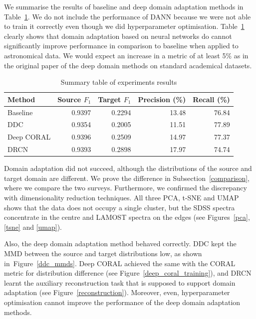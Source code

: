 We summarise the results of baseline and deep domain adaptation methods in Table~\ref{summary}.
We do not include the performance of DANN
because we were not able to train it correctly even though we did hyperparameter optimisation.
Table~\ref{summary} clearly shows that domain adaptation based on neural networks do cannot significantly improve performance in comparison to baseline
when applied to astronomical data.
We would expect an increase in a metric of at least 5\% as in the original paper of the deep domain methods on standard academical datasets.

\begin{table}
\begin{center}
\begin{tabular}{|l|r|r|r|r|}
	\hline
	Method & Source \(F_1\) & Target \(F_1\) & Precision (\%) & Recall (\%) \\
	\hline \hline
	Baseline & 0.9397 & 0.2294 & 13.48 & 76.84 \\ \hline
	DDC & 0.9354 & 0.2005 & 11.51 & 77.89 \\ \hline
	Deep CORAL & 0.9396 & 0.2509 & 14.97 & 77.37 \\ \hline
	DRCN & 0.9393 & 0.2898 & 17.97 & 74.74 \\ \hline
\end{tabular}
\end{center}
\caption{Summary table of experiments results}
\label{summary}
\end{table}

Domain adaptation did not succeed,
although the distributions of the source and target domain are different.
We prove the difference in Subsection~\ref{comparison},
where we compare the two surveys.
Furthermore, we confirmed the discrepancy with dimensionality reduction techniques.
All three PCA, t-SNE and UMAP shows that the data does not occupy a single cluster,
but the SDSS spectra concentrate in the centre and LAMOST spectra on the edges
(see Figures~\ref{pca}, \ref{tsne} and \ref{umap}).

Also, the deep domain adaptation method behaved correctly.
DDC kept the MMD between the source and target distributions low,
as shown in~Figure~\ref{ddc_mmds}.
Deep CORAL achieved the same with the CORAL metric for distribution difference
(see Figure~\ref{deep_coral_training}),
and DRCN learnt the auxiliary reconstruction task
that is supposed to support domain adaptation
(see Figure~\ref{reconstruction}).
Moreover, even, hyperparameter optimisation cannot improve the performance of the deep domain adaptation methods.

